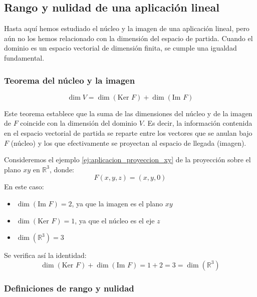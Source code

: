 \subsection{Rango y nulidad de una aplicación lineal}

Hasta aquí hemos estudiado el núcleo y la imagen de una aplicación lineal, pero aún no los hemos relacionado con la dimensión del espacio de partida. Cuando el dominio es un espacio vectorial de dimensión finita, se cumple una igualdad fundamental.

\subsubsection{Teorema del núcleo y la imagen}
\label{sec:teorema_dimensión_nucleo_imagen}

\label{teo:teorema_dimensión_nucleo_imagen}
\begin{equation}
  \dim V = \dim(\text{Ker } F) + \dim(\text{Im } F)
\end{equation}

Este teorema establece que la suma de las dimensiones del núcleo y de la imagen de \(F\) coincide con la dimensión del dominio \(V\). Es decir, la información contenida en el espacio vectorial de partida se reparte entre los vectores que se anulan bajo \(F\) (núcleo) y los que efectivamente se proyectan al espacio de llegada (imagen).

\vspace{5pt}


Consideremos el ejemplo \ref{ej:aplicacion_proyeccion_xy} de la proyección sobre el plano \(xy\) en \(\mathbb{R}^3\), donde:
\[
  F(x,y,z) = (x,y,0)
\]
En este caso:
\begin{itemize}
  \item \(\dim(\text{Im } F) = 2\), ya que la imagen es el plano \(xy\)
  \item \(\dim(\text{Ker } F) = 1\), ya que el núcleo es el eje \(z\)
  \item \(\dim(\mathbb{R}^3) = 3\)
\end{itemize}
Se verifica así la identidad:
\[
  \dim(\text{Ker } F) + \dim(\text{Im } F) = 1 + 2 = 3 = \dim(\mathbb{R}^3)
\]

\vspace{1em}

\subsubsection{Definiciones de rango y nulidad}

